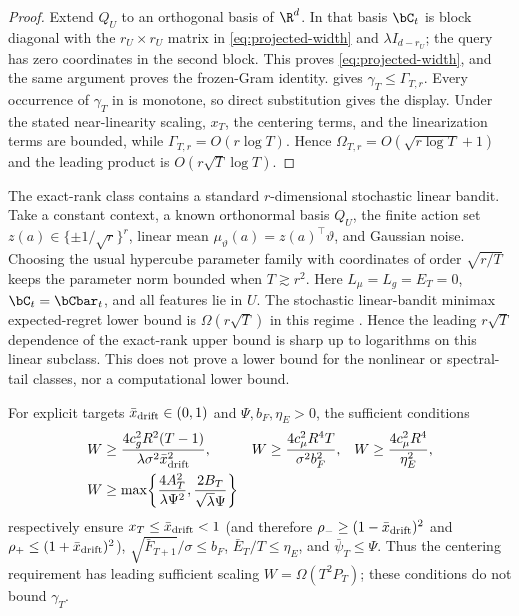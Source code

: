 \begin{proof}
Extend $Q_U$ to an orthogonal basis of $\R^d$.  In that basis $\bC_t$ is block
diagonal with the $r_U\times r_U$ matrix in \eqref{eq:projected-width} and
$\lambda I_{d-r_U}$; the query has zero coordinates in the second block.  This
proves \eqref{eq:projected-width}, and the same argument proves the frozen-Gram
identity.   gives $\gamma_T\le\Gamma_{T,r}$.  Every occurrence of
$\gamma_T$ in  is monotone, so direct substitution gives
the display.  Under the stated near-linearity scaling, $x_T$, the centering terms, and
the linearization terms are bounded, while
$\Gamma_{T,r}=O(r\log T)$.  Hence
$\Omega_{T,r}=O(\sqrt{r\log T}+1)$ and the leading product is
$O(r\sqrt T\log T)$.
\end{proof}

\begin{remark}
The exact-rank class contains a standard $r$-dimensional stochastic linear
bandit.  Take a constant context, a known orthonormal basis $Q_U$, the finite
action set $z(a)\in\{\pm1/\sqrt r\}^r$, linear mean
$\mu_\vartheta(a)=z(a)^\top\vartheta$, and Gaussian noise.  Choosing the usual
hypercube parameter family with coordinates of order $\sqrt{r/T}$ keeps the
parameter norm bounded when $T\gtrsim r^2$.  Here $L_\mu=L_g=E_T=0$,
$\bC_t=\bCbar_t$, and all features lie in $U$.  The stochastic linear-bandit
minimax expected-regret lower bound is $\Omega(r\sqrt T)$ in this regime
\citep{dani2008stochastic}.  Hence the leading $r\sqrt T$ dependence of the
exact-rank upper bound is sharp up to logarithms on this linear subclass.  This
does not prove a lower bound for the nonlinear or spectral-tail classes, nor a
computational lower bound.
\end{remark}

For explicit targets
$\bar x_{\rm drift}\in(0,1)$ and $\Psi,b_F,\eta_E>0$, the sufficient conditions
\begin{equation}\label{eq:width-thresholds}
\begin{aligned}
W&\ge\frac{4c_g^2R^2(T-1)}{\lambda\sigma^2\bar x_{\rm drift}^2},&
W&\ge\frac{4c_\mu^2R^4T}{\sigma^2b_F^2},&
W&\ge\frac{4c_\mu^2R^4}{\eta_E^2},\\
W&\ge\max\!\left\{\frac{4A_T^2}{\lambda\Psi^2},
\frac{2B_T}{\sqrt\lambda\Psi}\right\}
\end{aligned}
\end{equation}
respectively ensure $x_T\le\bar x_{\rm drift}<1$ (and therefore
$\rho_-\ge(1-\bar x_{\rm drift})^2$ and
$\rho_+\le(1+\bar x_{\rm drift})^2$),
$\sqrt{\bar F_{T+1}}/\sigma\le b_F$,
$\bar E_T/T\le\eta_E$, and $\bar\psi_T\le\Psi$.  Thus the centering
requirement has leading sufficient scaling $W=\Omega(T^2P_T)$; these
conditions do not bound $\gamma_T$.

